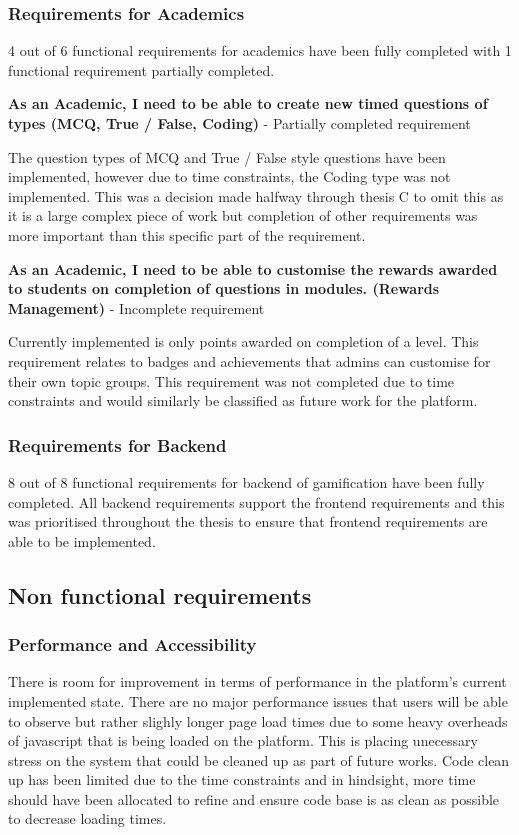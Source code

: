 \newpage

\subsubsection{Requirements for Academics}
4 out of 6 functional requirements for academics have been fully completed with 1 functional requirement partially completed.

\textbf{As an Academic, I need to be able to create new timed questions of types (MCQ, True / False, Coding)} - Partially completed requirement

The question types of MCQ and True / False style questions have been implemented, however due to time constraints, the Coding type was not implemented. This was a decision made halfway through thesis C to omit this as it is a large complex piece of work but completion of other requirements was more important than this specific part of the requirement.

\textbf{As an Academic, I need to be able to customise the rewards awarded to students on completion of questions in modules. (Rewards Management)} - Incomplete requirement

Currently implemented is only points awarded on completion of a level. This requirement relates to badges and achievements that admins can customise for their own topic groups. This requirement was not completed due to time constraints and would similarly be classified as future work for the platform.

\subsubsection{Requirements for Backend}
8 out of 8 functional requirements for backend of gamification have been fully completed. All backend requirements support the frontend requirements and this was prioritised throughout the thesis to ensure that frontend requirements are able to be implemented.

\subsection {Non functional requirements}
\subsubsection {Performance and Accessibility}

There is room for improvement in terms of performance in the platform's current implemented state. There are no major performance issues that users will be able to observe but rather slighly longer page load times due to some heavy overheads of javascript that is being loaded on the platform. This is placing unecessary stress on the system that could be cleaned up as part of future works. Code clean up has been limited due to the time constraints and in hindsight, more time should have been allocated to refine and ensure code base is as clean as possible to decrease loading times.


